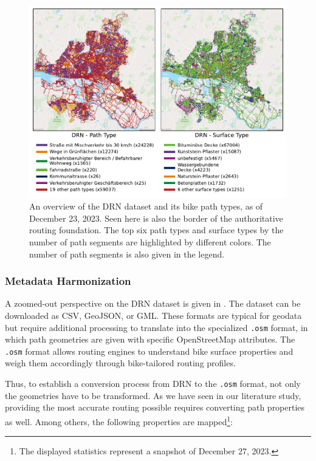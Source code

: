 \begin{figure}[t]
\centering
\includegraphics[width=\linewidth]{images/routing-drn.pdf}
\caption{An overview of the DRN dataset and its bike path types, as of December 23, 2023. Seen here is also the border of the authoritative routing foundation. The top six path types and surface types by the number of path segments are highlighted by different colors. The number of path segments is also given in the legend.}
\label{fig:drn-map}
\end{figure}

\subsubsection{Metadata Harmonization}\label{sec:maxlorenz1}

A zoomed-out perspective on the DRN dataset is given in . The dataset can be downloaded as CSV, GeoJSON, or GML. These formats are typical for geodata but require additional processing to translate into the specialized \texttt{.osm} format, in which path geometries are given with specific OpenStreetMap attributes. The \texttt{.osm} format allows routing engines to understand bike surface properties and weigh them accordingly through bike-tailored routing profiles.  

Thus, to establish a conversion process from DRN to the \texttt{.osm} format, not only the geometries have to be transformed. As we have seen in our literature study, providing the most accurate routing possible requires converting path properties as well. Among others, the following properties are mapped\footnote{The displayed statistics represent a snapshot of December 27, 2023.}:

